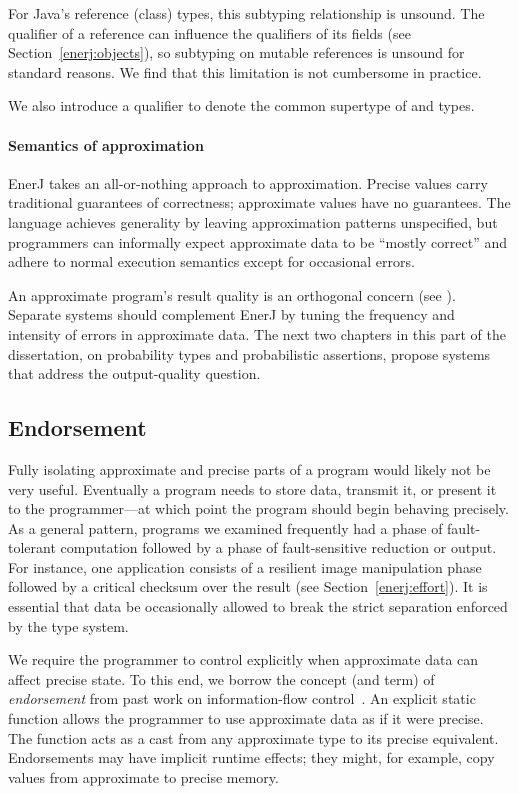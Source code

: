 For Java's reference (class) types, this
subtyping relationship is unsound. The qualifier of a reference can
influence the qualifiers of its fields (see Section~\ref{enerj:objects}),
so subtyping on mutable references is unsound for standard reasons.
We find that this limitation is not cumbersome in practice.

We also introduce a  qualifier to denote the common
supertype of  and  types.

\paragraph{Semantics of approximation}
EnerJ takes an all-or-nothing approach to approximation.
Precise values carry traditional guarantees of correctness; approximate
values have no guarantees.
The language achieves generality by leaving approximation patterns
unspecified, but programmers can informally expect approximate data to
be ``mostly correct'' and adhere to normal execution semantics except
for occasional errors.

An approximate program's result quality is an orthogonal concern (see
).
Separate systems should complement EnerJ by tuning the frequency and intensity
of errors in approximate data.
The next two chapters in this part of the dissertation, on probability types
and probabilistic assertions, propose systems that address the output-quality
question.

\subsection{Endorsement}
\label{enerj:endorsement}
Fully isolating approximate and precise parts of a program would
likely not be very useful. Eventually a program needs to store data,
transmit it, or present it to the programmer---at which point the program
should begin behaving precisely. As a general pattern, programs we
examined frequently had a phase of fault-tolerant computation followed
by a phase of fault-sensitive reduction or output.
For instance, one application consists of a resilient image
manipulation phase followed by a critical checksum over
the result (see Section~\ref{enerj:effort}).
It is essential that data be
occasionally allowed to break the strict separation enforced by the type
system. %

We require the programmer to
control explicitly when approximate data can affect precise state. To
this end, we borrow the concept (and term) of {\em
  endorsement} from past work on information-flow control~\cite{endorsement}.
An explicit static function  allows the
programmer to use approximate data as if it were
precise. The function acts as a cast from any approximate type to its
precise equivalent. Endorsements may have implicit runtime effects;
they might, for example, copy values from approximate to precise memory.

